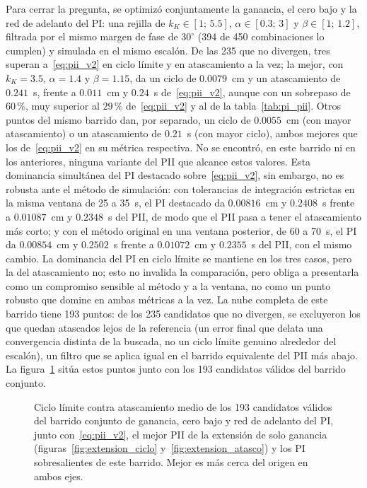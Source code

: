 Para cerrar la pregunta, se optimizó conjuntamente la ganancia, el cero bajo y la red de adelanto del PI: una rejilla de $k_K\in[1;\,5.5]$, $\alpha\in[0.3;\,3]$ y $\beta\in[1;\,1.2]$, filtrada por el mismo margen de fase de $30^\circ$ (394 de 450 combinaciones lo cumplen) y simulada en el mismo escalón. De las 235 que no divergen, tres superan a~\eqref{eq:pii_v2} en ciclo límite y en atascamiento a la vez; la mejor, con $k_K=3.5$, $\alpha=1.4$ y $\beta=1.15$, da un ciclo de $0.0079$~cm y un atascamiento de $0.241$~s, frente a $0.011$~cm y $0.24$~s de~\eqref{eq:pii_v2}, aunque con un sobrepaso de $60$\,\%, muy superior al $29$\,\% de~\eqref{eq:pii_v2} y al de la tabla~\ref{tab:pi_pii}. Otros puntos del mismo barrido dan, por separado, un ciclo de $0.0055$~cm (con mayor atascamiento) o un atascamiento de $0.21$~s (con mayor ciclo), ambos mejores que los de~\eqref{eq:pii_v2} en su métrica respectiva. No se encontró, en este barrido ni en los anteriores, ninguna variante del PII que alcance estos valores. Esta dominancia simultánea del PI destacado sobre~\eqref{eq:pii_v2}, sin embargo, no es robusta ante el método de simulación: con tolerancias de integración estrictas en la misma ventana de 25 a 35~s, el PI destacado da $0.00816$~cm y $0.2408$~s frente a $0.01087$~cm y $0.2348$~s del PII, de modo que el PII pasa a tener el atascamiento más corto; y con el método original en una ventana posterior, de 60 a 70~s, el PI da $0.00854$~cm y $0.2502$~s frente a $0.01072$~cm y $0.2355$~s del PII, con el mismo cambio. La dominancia del PI en ciclo límite se mantiene en los tres casos, pero la del atascamiento no; esto no invalida la comparación, pero obliga a presentarla como un compromiso sensible al método y a la ventana, no como un punto robusto que domine en ambas métricas a la vez. La nube completa de este barrido tiene 193 puntos: de los 235 candidatos que no divergen, se excluyeron los que quedan atascados lejos de la referencia (un error final que delata una convergencia distinta de la buscada, no un ciclo límite genuino alrededor del escalón), un filtro que se aplica igual en el barrido equivalente del PII más abajo. La figura~\ref{fig:barrido_conjunto} sitúa estos puntos junto con los 193 candidatos válidos del barrido conjunto.

\begin{figure}[ht]
    \centering
    
    \caption[Barrido conjunto del PI contra PII\_V2]{Ciclo límite contra atascamiento medio de los 193 candidatos válidos del barrido conjunto de ganancia, cero bajo y red de adelanto del PI, junto con~\eqref{eq:pii_v2}, el mejor PII de la extensión de solo ganancia (figuras~\ref{fig:extension_ciclo} y~\ref{fig:extension_atasco}) y los PI sobresalientes de este barrido. Mejor es más cerca del origen en ambos ejes.}
    \label{fig:barrido_conjunto}
\end{figure}

